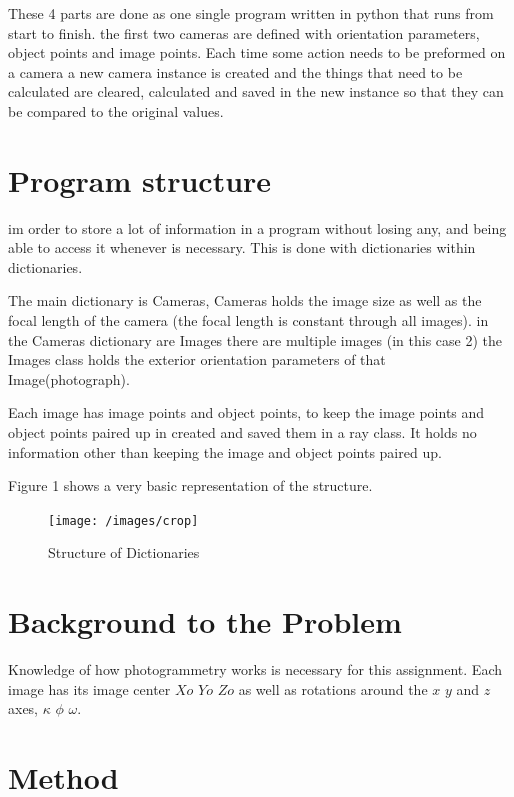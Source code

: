 \documentclass[12pt,a4paper]{article}
\begin{document}
	These 4 parts are done as one single program written in python that runs from start to finish. the first two cameras are defined with orientation parameters, object points and image points. Each time some action needs to be preformed on a camera a new camera instance is created and the things that need to be calculated are cleared, calculated and saved in the new instance so that they can be compared to the original values.
	
	\section{Program structure}
	
	im order to store a lot of information in a program without losing any, and being able to access it whenever is necessary. This is done with dictionaries within dictionaries.
	
	The main dictionary is Cameras, Cameras holds the image size as well as the focal length of the camera (the focal length is constant through all images). in the Cameras dictionary are Images there are multiple images (in this case 2) the Images class holds the exterior orientation parameters of that Image(photograph).
	
	Each image has image points and object points, to keep the image points and object points paired up in created and saved them in a ray class. It holds no information other than keeping the image and object points paired up.
	
	Figure 1 shows a very basic representation of the structure.
	
	\begin{figure}[H]
		\centering
		\texttt{[image: /images/crop]}
		\caption{Structure of Dictionaries}
		\label{fig:structure}
	\end{figure}


	\section{Background to the Problem}
	
	Knowledge of how photogrammetry works is necessary for this assignment. Each image has its image center $Xo$ $Yo$ $Zo$ as well as rotations around the $x$ $y$ and $z$ axes, $\kappa$ $\phi$ $\omega$. 
	
	\section{Method}
	
\end{document}

